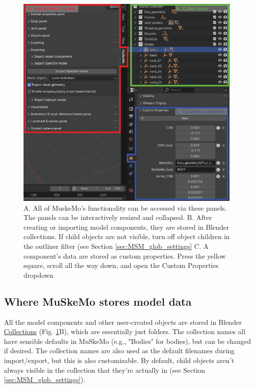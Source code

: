 \documentclass{article}
\begin{document}
\begin{figure}[htbp]
    \centering
    \includegraphics[width=0.99\textwidth]{figures/panels_coll_props.eps} %
    \caption{A. All of MuskeMo's functionality can be accessed via these panels. The panels can be interactively resized and collapsed. B. After creating or importing model components, they are stored in Blender collections. If child objects are not visible, turn off object children in the outliner filter (see Section \ref{sec:MSM_glob_settings} C. A component's data are stored as custom properties. Press the yellow square, scroll all the way down, and open the Custom Properties dropdown}
    \label{fig:MuSkeMoUI}
\end{figure}

\subsection{Where MuSkeMo stores model data}
\label{sec:muskemodata}
All the model components and other user-created objects are stored in Blender \href{https://docs.blender.org/manual/en/latest/scene_layout/collections/collections.html}{Collections} (Fig. \ref{fig:MuSkeMoUI}B), which are essentially just folders. The collection names all have sensible defaults in MuSkeMo (e.g., "Bodies" for bodies), but can be changed if desired. The collection names are also used as the default filenames during import/export, but this is also customizable. By default, child objects aren't always visible in the collection that they're actually in (see Section \ref{sec:MSM_glob_settings}).
\end{document}
